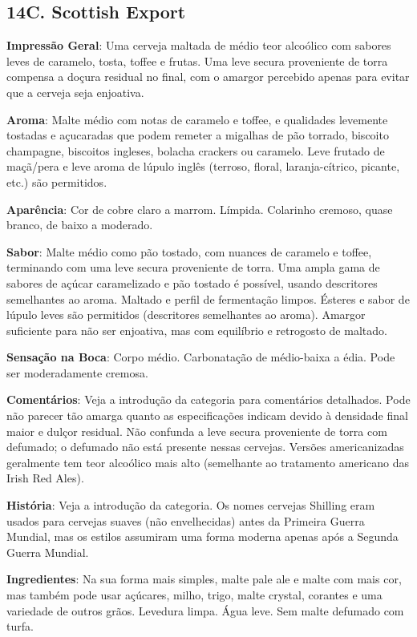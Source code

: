 \subsection*{14C. Scottish Export}
\textbf{Impressão Geral}: Uma cerveja maltada de médio teor alcoólico com sabores leves de caramelo, tosta, toffee e frutas. Uma leve secura proveniente de torra compensa a doçura residual no final, com o amargor percebido apenas para evitar que a cerveja seja enjoativa.

\textbf{Aroma}: Malte médio com notas de caramelo e toffee, e qualidades levemente tostadas e açucaradas que podem remeter a migalhas de pão torrado, biscoito champagne, biscoitos ingleses, bolacha crackers ou caramelo. Leve frutado de maçã/pera e leve aroma de lúpulo inglês (terroso, floral, laranja-cítrico, picante, etc.) são permitidos.

\textbf{Aparência}: Cor de cobre claro a marrom. Límpida. Colarinho cremoso, quase branco, de baixo a moderado.

\textbf{Sabor}: Malte médio como pão tostado, com nuances de caramelo e toffee, terminando com uma leve secura proveniente de torra. Uma ampla gama de sabores de açúcar caramelizado e pão tostado é possível, usando descritores semelhantes ao aroma. Maltado e perfil de fermentação limpos. Ésteres e sabor de lúpulo leves são permitidos (descritores semelhantes ao aroma). Amargor suficiente para não ser enjoativa, mas com equilíbrio e retrogosto de maltado.

\textbf{Sensação na Boca}: Corpo médio. Carbonatação de médio-baixa a édia. Pode ser moderadamente cremosa.

\textbf{Comentários}:  Veja a introdução da categoria para comentários detalhados. Pode não parecer tão amarga quanto as especificações indicam devido à densidade final maior e dulçor residual. Não confunda  a leve secura proveniente de torra com defumado; o defumado não está presente nessas cervejas. Versões americanizadas geralmente tem teor alcoólico mais alto (semelhante ao tratamento americano das Irish Red Ales).

\textbf{História}: Veja a introdução da categoria. Os nomes cervejas Shilling eram usados para cervejas suaves (não envelhecidas) antes da Primeira Guerra Mundial, mas os estilos assumiram uma forma moderna apenas após a Segunda Guerra Mundial.

\textbf{Ingredientes}: Na sua forma mais simples, malte pale ale e malte com mais cor, mas também pode usar açúcares, milho, trigo, malte crystal, corantes e uma variedade de outros grãos. Levedura limpa. Água leve. Sem malte defumado com turfa.

